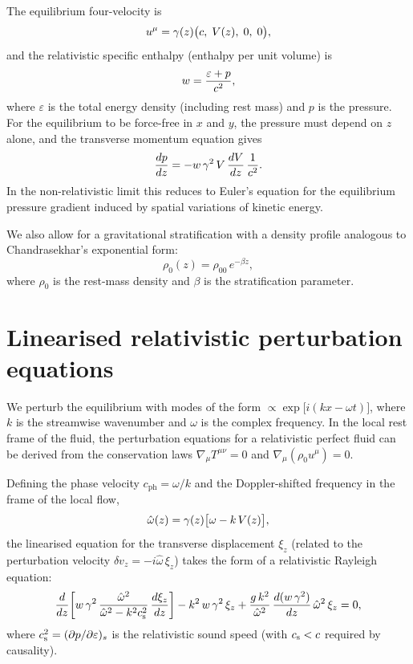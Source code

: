 The equilibrium four-velocity is
\begin{equation}
\label{eq:rel-104-4}
u^\mu = \gamma(z)\bigl(c,\;V(z),\;0,\;0\bigr),
\end{equation}
and the relativistic specific enthalpy (enthalpy per unit volume) is
\begin{equation}
\label{eq:rel-104-5}
w = \frac{\varepsilon + p}{c^2},
\end{equation}
where $\varepsilon$ is the total energy density (including rest mass)
and $p$ is the pressure.  For the equilibrium to be force-free in $x$
and $y$, the pressure must depend on $z$ alone, and the transverse
momentum equation gives
\begin{equation}
\label{eq:rel-104-6}
\frac{dp}{dz} = -w\,\gamma^2\,V\,\frac{dV}{dz}\,\frac{1}{c^2}.
\end{equation}
In the non-relativistic limit this reduces to Euler's equation for the
equilibrium pressure gradient induced by spatial variations of kinetic
energy.

We also allow for a gravitational stratification with a density
profile analogous to Chandrasekhar's exponential form:
\begin{equation}
\label{eq:rel-104-7}
\rho_0(z) = \rho_{00}\,e^{-\beta z},
\end{equation}
where $\rho_0$ is the rest-mass density and $\beta$ is the
stratification parameter.

\section{Linearised relativistic perturbation equations}
\label{sec:rel-11-104-pert}

We perturb the equilibrium with modes of the form
$\propto \exp\!\bigl[i(kx - \omega t)\bigr]$, where $k$ is the
streamwise wavenumber and $\omega$ is the complex frequency.  In the
local rest frame of the fluid, the perturbation equations for a
relativistic perfect fluid can be derived from the conservation laws
$\nabla_\mu T^{\mu\nu}=0$ and $\nabla_\mu(\rho_0 u^\mu)=0$.

Defining the phase velocity $c_{\mathrm{ph}}=\omega/k$ and the
Doppler-shifted frequency in the frame of the local flow,
\begin{equation}
\label{eq:rel-104-8}
\hat{\omega}(z) = \gamma(z)\bigl[\omega - k\,V(z)\bigr],
\end{equation}
the linearised equation for the transverse displacement $\xi_z$
(related to the perturbation velocity $\delta v_z = -i\hat\omega\,\xi_z$)
takes the form of a relativistic Rayleigh equation:
\begin{equation}
\label{eq:rel-104-9}
\frac{d}{dz}\!\left[w\,\gamma^2\,
  \frac{\hat\omega^2}{\hat\omega^2 - k^2 c_{\mathrm{s}}^2}\,
  \frac{d\xi_z}{dz}\right]
- k^2\,w\,\gamma^2\,\xi_z
+ \frac{g\,k^2}{\hat\omega^2}\,\frac{d(w\,\gamma^2)}{dz}\,
  \hat\omega^2\,\xi_z = 0,
\end{equation}
where $c_{\mathrm{s}}^2 = (\partial p/\partial\varepsilon)_s$ is the relativistic
sound speed (with $c_{\mathrm{s}} < c$ required by causality).

